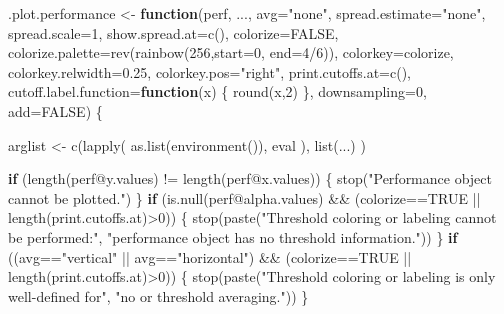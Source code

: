 \documentclass[
  letterpaper,
  DIV=11,
  numbers=noendperiod]{scrartcl}
\newenvironment{Shaded}{\begin{snugshade}}{\end{snugshade}}
\newcommand{\AttributeTok}[1]{\textcolor[rgb]{0.40,0.45,0.13}{#1}}
\newcommand{\ConstantTok}[1]{\textcolor[rgb]{0.56,0.35,0.01}{#1}}
\newcommand{\ControlFlowTok}[1]{\textcolor[rgb]{0.00,0.23,0.31}{\textbf{#1}}}
\newcommand{\DecValTok}[1]{\textcolor[rgb]{0.68,0.00,0.00}{#1}}
\newcommand{\FloatTok}[1]{\textcolor[rgb]{0.68,0.00,0.00}{#1}}
\newcommand{\FunctionTok}[1]{\textcolor[rgb]{0.28,0.35,0.67}{#1}}
\newcommand{\NormalTok}[1]{\textcolor[rgb]{0.00,0.23,0.31}{#1}}
\newcommand{\OtherTok}[1]{\textcolor[rgb]{0.00,0.23,0.31}{#1}}
\newcommand{\SpecialCharTok}[1]{\textcolor[rgb]{0.37,0.37,0.37}{#1}}
\newcommand{\StringTok}[1]{\textcolor[rgb]{0.13,0.47,0.30}{#1}}
\begin{document}
\begin{Shaded}
\begin{Highlighting}[]
\NormalTok{.plot.performance }\OtherTok{\textless{}{-}}
  \ControlFlowTok{function}\NormalTok{(perf, ..., }\AttributeTok{avg=}\StringTok{"none"}\NormalTok{,}
           \AttributeTok{spread.estimate=}\StringTok{"none"}\NormalTok{, }\AttributeTok{spread.scale=}\DecValTok{1}\NormalTok{, }\AttributeTok{show.spread.at=}\FunctionTok{c}\NormalTok{(),}
           \AttributeTok{colorize=}\ConstantTok{FALSE}\NormalTok{, }\AttributeTok{colorize.palette=}\FunctionTok{rev}\NormalTok{(}\FunctionTok{rainbow}\NormalTok{(}\DecValTok{256}\NormalTok{,}\AttributeTok{start=}\DecValTok{0}\NormalTok{, }\AttributeTok{end=}\DecValTok{4}\SpecialCharTok{/}\DecValTok{6}\NormalTok{)),}
           \AttributeTok{colorkey=}\NormalTok{colorize, }\AttributeTok{colorkey.relwidth=}\FloatTok{0.25}\NormalTok{, }\AttributeTok{colorkey.pos=}\StringTok{"right"}\NormalTok{,}
           \AttributeTok{print.cutoffs.at=}\FunctionTok{c}\NormalTok{(),}
           \AttributeTok{cutoff.label.function=}\ControlFlowTok{function}\NormalTok{(x) \{ }\FunctionTok{round}\NormalTok{(x,}\DecValTok{2}\NormalTok{) \},}
           \AttributeTok{downsampling=}\DecValTok{0}\NormalTok{, }\AttributeTok{add=}\ConstantTok{FALSE}\NormalTok{) \{}

\NormalTok{      arglist }\OtherTok{\textless{}{-}} \FunctionTok{c}\NormalTok{(}\FunctionTok{lapply}\NormalTok{( }\FunctionTok{as.list}\NormalTok{(}\FunctionTok{environment}\NormalTok{()), eval ), }\FunctionTok{list}\NormalTok{(...) )}

      \ControlFlowTok{if}\NormalTok{ (}\FunctionTok{length}\NormalTok{(perf}\SpecialCharTok{@}\NormalTok{y.values) }\SpecialCharTok{!=} \FunctionTok{length}\NormalTok{(perf}\SpecialCharTok{@}\NormalTok{x.values)) \{}
          \FunctionTok{stop}\NormalTok{(}\StringTok{"Performance object cannot be plotted."}\NormalTok{)}
\NormalTok{      \}}
      \ControlFlowTok{if}\NormalTok{ (}\FunctionTok{is.null}\NormalTok{(perf}\SpecialCharTok{@}\NormalTok{alpha.values) }\SpecialCharTok{\&\&}\NormalTok{ (colorize}\SpecialCharTok{==}\ConstantTok{TRUE} \SpecialCharTok{||}
                                         \FunctionTok{length}\NormalTok{(print.cutoffs.at)}\SpecialCharTok{\textgreater{}}\DecValTok{0}\NormalTok{)) \{}
          \FunctionTok{stop}\NormalTok{(}\FunctionTok{paste}\NormalTok{(}\StringTok{"Threshold coloring or labeling cannot be performed:"}\NormalTok{,}
                     \StringTok{"performance object has no threshold information."}\NormalTok{))}
\NormalTok{      \}}
      \ControlFlowTok{if}\NormalTok{ ((avg}\SpecialCharTok{==}\StringTok{"vertical"} \SpecialCharTok{||}\NormalTok{ avg}\SpecialCharTok{==}\StringTok{"horizontal"}\NormalTok{) }\SpecialCharTok{\&\&}
\NormalTok{          (colorize}\SpecialCharTok{==}\ConstantTok{TRUE} \SpecialCharTok{||} \FunctionTok{length}\NormalTok{(print.cutoffs.at)}\SpecialCharTok{\textgreater{}}\DecValTok{0}\NormalTok{)) \{}
          \FunctionTok{stop}\NormalTok{(}\FunctionTok{paste}\NormalTok{(}\StringTok{"Threshold coloring or labeling is only well{-}defined for"}\NormalTok{,}
                     \StringTok{"\textquotesingle{}no\textquotesingle{} or \textquotesingle{}threshold\textquotesingle{} averaging."}\NormalTok{))}
\NormalTok{      \}}
    

\end{Highlighting}
\end{Shaded}
\end{document}
